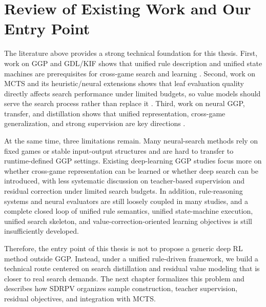 \section{Review of Existing Work and Our Entry Point}

The literature above provides a strong technical foundation for this thesis. First, work on GGP and GDL/KIF shows that unified rule description and unified state machines are prerequisites for cross-game search and learning \cite{genesereth2005general,thielscher2017gdl3,he2024qbf}. Second, work on MCTS and its heuristic/neural extensions shows that leaf evaluation quality directly affects search performance under limited budgets, so value models should serve the search process rather than replace it \cite{browne2012survey,finnsson2008simulation,liu2024efficient}. Third, work on neural GGP, transfer, and distillation shows that unified representation, cross-game generalization, and strong supervision are key directions \cite{mcewan2022knowledge,soemers2023transfer,partridge2022hidden,maras2024fast}.

At the same time, three limitations remain. Many neural-search methods rely on fixed games or stable input-output structures and are hard to transfer to runtime-defined GGP settings. Existing deep-learning GGP studies focus more on whether cross-game representation can be learned or whether deep search can be introduced, with less systematic discussion on teacher-based supervision and residual correction under limited search budgets. In addition, rule-reasoning systems and neural evaluators are still loosely coupled in many studies, and a complete closed loop of unified rule semantics, unified state-machine execution, unified search skeleton, and value-correction-oriented learning objectives is still insufficiently developed.

Therefore, the entry point of this thesis is not to propose a generic deep RL method outside GGP. Instead, under a unified rule-driven framework, we build a technical route centered on search distillation and residual value modeling that is closer to real search demands. The next chapter formalizes this problem and describes how SDRPV organizes sample construction, teacher supervision, residual objectives, and integration with MCTS.
